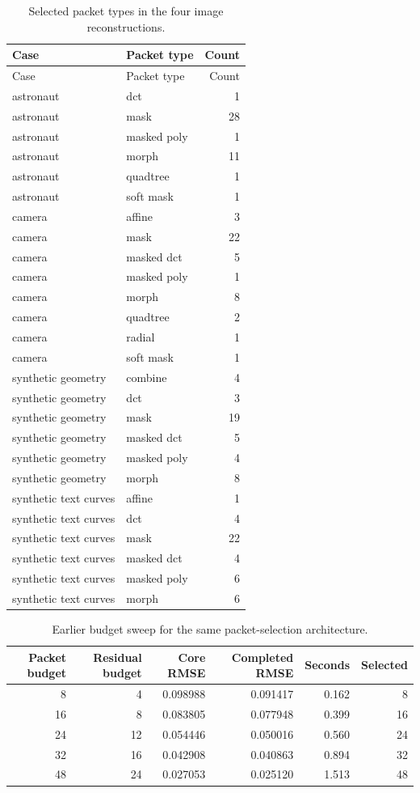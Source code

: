 \begin{longtable}{llr}
\caption{Selected packet types in the four image reconstructions.}\label{tab:kinds}\\
\toprule Case & Packet type & Count\\\midrule
\endfirsthead\toprule Case & Packet type & Count\\\midrule\endhead
astronaut & dct & 1\\
astronaut & mask & 28\\
astronaut & masked poly & 1\\
astronaut & morph & 11\\
astronaut & quadtree & 1\\
astronaut & soft mask & 1\\
camera & affine & 3\\
camera & mask & 22\\
camera & masked dct & 5\\
camera & masked poly & 1\\
camera & morph & 8\\
camera & quadtree & 2\\
camera & radial & 1\\
camera & soft mask & 1\\
synthetic geometry & combine & 4\\
synthetic geometry & dct & 3\\
synthetic geometry & mask & 19\\
synthetic geometry & masked dct & 5\\
synthetic geometry & masked poly & 4\\
synthetic geometry & morph & 8\\
synthetic text curves & affine & 1\\
synthetic text curves & dct & 4\\
synthetic text curves & mask & 22\\
synthetic text curves & masked dct & 4\\
synthetic text curves & masked poly & 6\\
synthetic text curves & morph & 6\\
\bottomrule\end{longtable}

\begin{table}[H]\centering
\caption{Earlier budget sweep for the same packet-selection architecture.}\label{tab:budget}
\small\begin{tabular}{rrrrrr}\toprule Packet budget & Residual budget & Core RMSE & Completed RMSE & Seconds & Selected\\\midrule
8 & 4 & 0.098988 & 0.091417 & 0.162 & 8\\
16 & 8 & 0.083805 & 0.077948 & 0.399 & 16\\
24 & 12 & 0.054446 & 0.050016 & 0.560 & 24\\
32 & 16 & 0.042908 & 0.040863 & 0.894 & 32\\
48 & 24 & 0.027053 & 0.025120 & 1.513 & 48\\
\bottomrule\end{tabular}\end{table}

